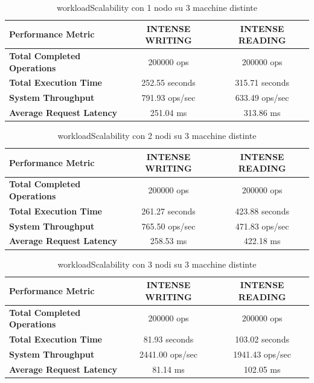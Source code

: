 \documentclass[12pt]{article}
\begin{document}
\begin{table}[H]
\centering
\begin{tabular}{|l|c|c|}
\hline
\textbf{Performance Metric} & \textbf{INTENSE WRITING} & \textbf{INTENSE READING} \\
\hline
\textbf{Total Completed Operations} & 200000 ops & 200000 ops \\
\hline
\textbf{Total Execution Time} & 252.55 seconds & 315.71 seconds \\
\hline
\textbf{System Throughput} & 791.93 ops/sec & 633.49 ops/sec \\
\hline
\textbf{Average Request Latency} & 251.04 ms & 313.86 ms \\
\hline
\end{tabular}
\caption{workloadScalability con 1 nodo su 3 macchine distinte}
\label{t_1node_dist}
\end{table}

\begin{table}[H]
\centering
\begin{tabular}{|l|c|c|}
\hline
\textbf{Performance Metric} & \textbf{INTENSE WRITING} & \textbf{INTENSE READING} \\
\hline
\textbf{Total Completed Operations} & 200000 ops & 200000 ops \\
\hline
\textbf{Total Execution Time} & 261.27 seconds & 423.88 seconds \\
\hline
\textbf{System Throughput} & 765.50 ops/sec & 471.83 ops/sec \\
\hline
\textbf{Average Request Latency} & 258.53 ms & 422.18 ms \\
\hline
\end{tabular}
\caption{workloadScalability con 2 nodi su 3 macchine distinte}
\label{t_2nodes_dist}
\end{table}

\begin{table}[H]
\centering
\begin{tabular}{|l|c|c|}
\hline
\textbf{Performance Metric} & \textbf{INTENSE WRITING} & \textbf{INTENSE READING} \\
\hline
\textbf{Total Completed Operations} & 200000 ops & 200000 ops \\
\hline
\textbf{Total Execution Time} & 81.93 seconds & 103.02 seconds \\
\hline
\textbf{System Throughput} & 2441.00 ops/sec & 1941.43 ops/sec \\
\hline
\textbf{Average Request Latency} & 81.14 ms & 102.05 ms \\
\hline
\end{tabular}
\caption{workloadScalability con 3 nodi su 3 macchine distinte}
\label{t_3nodes_dist}
\end{table}
\end{document}
